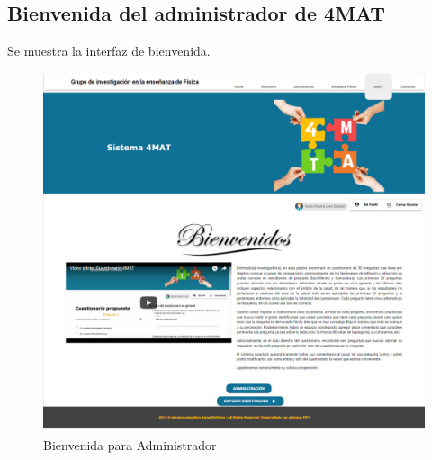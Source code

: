 \subsection{Bienvenida del administrador de 4MAT}

Se muestra la interfaz de bienvenida.
	\begin{figure}[hbtp]
		
		\includegraphics[scale=0.3]{images/Interfaz/IUGS01_binevenida.png}
		\caption{Bienvenida para Administrador}
	\end{figure}
	

